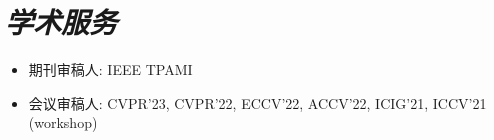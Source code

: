 \documentclass[UTF8]{ctexart}
\begin{document}
	\section{\textit{\textbf{学术服务}}}
	\begin{itemize}
		\item 期刊审稿人: IEEE TPAMI
		\item 会议审稿人: CVPR'23, CVPR'22, ECCV'22, ACCV'22, ICIG'21, ICCV'21 (workshop)
	\end{itemize}
	
	
\end{document}
